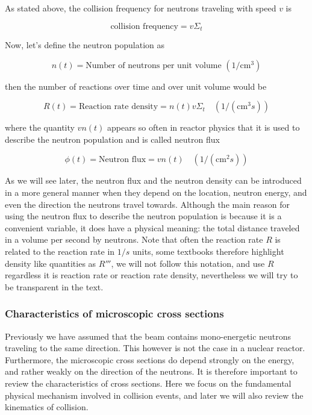 As stated above, the collision frequency for neutrons traveling with speed $v$ is 

\begin{equation}
\text{collision frequency}=v\Sigma_t
\end{equation}

\noindent Now, let's define the neutron population as 

\begin{equation}
n(t)=\text{Number of neutrons per unit volume }(1/\text{cm}^3)
\end{equation}

\noindent then the number of reactions over time and over unit volume would be

\begin{equation}
R(t)=\text{Reaction rate density}=n(t)v\Sigma_t \quad (1/(\text{cm}^3s))
\end{equation}

\noindent where the quantity $vn(t)$ appears so often in reactor physics that it is used to describe the neutron population and is called neutron flux

\begin{equation}
\phi(t)=\text{Neutron flux}=vn(t) \quad (1/(\text{cm}^2s))
\end{equation}

As we will see later, the neutron flux and the neutron density can be introduced in a more general manner when they depend on the location, neutron energy, and even the direction the neutrons travel towards. Although the main reason for using the neutron flux to describe the neutron population is because it is a convenient variable, it does have a physical meaning: the total distance traveled in a volume per second by neutrons. Note that often the reaction rate $R$ is related to the reaction rate in $1/s$ units, some textbooks therefore highlight density like quantities as $R'''$, we will not follow this notation, and use $R$ regardless it is reaction rate or reaction rate density, nevertheless we will try to be transparent in the text.


\subsubsection{Characteristics of microscopic cross sections}

Previously we have assumed that the beam contains mono-energetic neutrons traveling to the same direction. This however is not the case in a nuclear reactor. Furthermore, the microscopic cross sections do depend strongly on the energy, and rather weakly on the direction of the neutrons. It is therefore important to review the characteristics of cross sections. Here we focus on the fundamental physical mechanism involved in collision events, and later we will also review the kinematics of collision.

